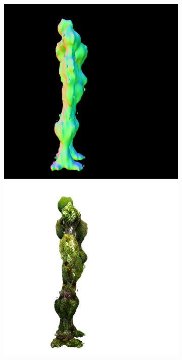 \begin{figure}[ht]
\begin{subfigure}[b]{0.222\textwidth}
        \caption{}
    \end{subfigure}
    \begin{subfigure}[b]{0.222\textwidth}
        \centering
        \fontsize{9pt}{7pt}\selectfont{}\vspace{.1cm}
        \includegraphics[width=\textwidth]{figures/appendix/magic123_refine_robot_right_10000_part2.png}
        \includegraphics[width=\textwidth]{figures/appendix/magic123_refine_robot_right_10000_part1.png}

\end{subfigure}
\end{figure}
